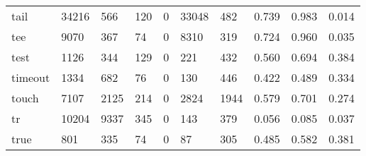 \begin{longtable}{lp{1.3cm}p{1.3cm}p{1.3cm}p{1.3cm}p{1.3cm}p{1.3cm}p{1.3cm}p{1.3cm}p{1.3cm}}
tail      &                  34216 &                                566 &                               120 &                                0 &                             33048 &                             482 &                                   0.739 &                                  0.983 &                                0.014 \\
tee       &                   9070 &                                367 &                                74 &                                0 &                              8310 &                             319 &                                   0.724 &                                  0.960 &                                0.035 \\
test      &                   1126 &                                344 &                               129 &                                0 &                               221 &                             432 &                                   0.560 &                                  0.694 &                                0.384 \\
timeout   &                   1334 &                                682 &                                76 &                                0 &                               130 &                             446 &                                   0.422 &                                  0.489 &                                0.334 \\
touch     &                   7107 &                               2125 &                               214 &                                0 &                              2824 &                            1944 &                                   0.579 &                                  0.701 &                                0.274 \\
tr        &                  10204 &                               9337 &                               345 &                                0 &                               143 &                             379 &                                   0.056 &                                  0.085 &                                0.037 \\
true      &                    801 &                                335 &                                74 &                                0 &                                87 &                             305 &                                   0.485 &                                  0.582 &                                0.381 \\

\end{longtable}
